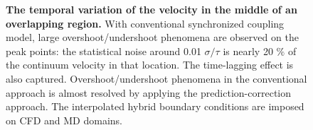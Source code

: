 \documentclass[preprint,12pt]{elsarticle}
\begin{document}
\begin{figure}
\centering
{}
\hskip 1cm
\vskip-0.2cm
\caption[]{\small {\bf The temporal variation of the velocity in the middle of an overlapping region.}
 With conventional synchronized coupling model, large overshoot/undershoot phenomena are observed on the peak points: the statistical noise around 0.01 $\sigma/\tau$ is nearly 20 $\%$ of the continuum velocity in that location. The time-lagging effect is also captured.
 Overshoot/undershoot phenomena in the conventional approach is almost resolved by applying the prediction-correction approach. The interpolated hybrid boundary conditions are imposed on CFD and MD domains.}
\label{Temporal1}
\end{figure}
\end{document}
